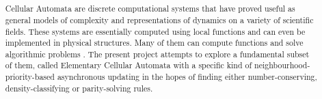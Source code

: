 \documentclass[a4paper,12pt]{ltxdoc}
\title{\protect\parbox{\textwidth}{\protect\centering \textbf{\titulo}}}
\date{}
\begin{document}
\def\instnum{}
\newcommand{\titulo}{
  \large{\centerline{Três Experimentos com Atualização Assíncrona por Prioridade}}
  \large{\centerline{de Vizinhança em Autômatos Celulares Elementares}}
  \\~\\
  \normalfont{\normalsize{Marcelo Vironda Rozanti\\Felipe Stefanelli de Aguiar Silva\\Prof. Dr. Pedro Paulo Balbi de Oliveira\\Faculdade de Computação e Informática - Universidade Presbiteriana Mackenzie \\São Paulo, SP -- Brasil}}\\
}

\maketitle

\begin{abstract}
  Cellular Automata are discrete computational systems that have proved useful as general models of complexity and representations of dynamics on a variety of scientific fields. These systems are essentially computed using local functions and can even be implemented in physical structures. Many of them can compute functions and solve algorithmic problems . The present project attempts to explore a fundamental subset of them, called Elementary Cellular Automata with a specific kind of neighbourhood-priority-based asynchronous updating in the hopes of finding either number-conserving, density-classifying or parity-solving rules.
\end{abstract}
\end{document}
